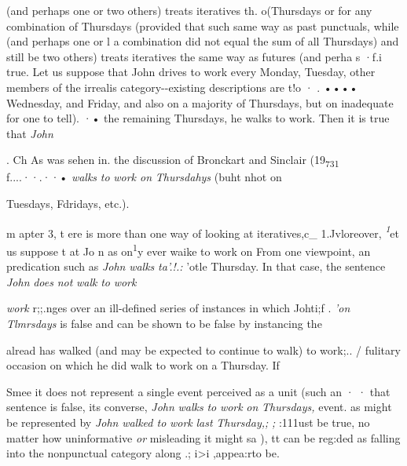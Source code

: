 
 (and perhaps one or two others) treats iteratives th{\textquotedbl}{\textquotedbl}. o(Thursdays or for any combination of Thursdays (provided that such same way as past punctuals, while  (and perhaps one or l a combination did not equal the sum of all Thursdays) and still be
two others) treats iteratives the same way as futures (and perha s ·f.i
true. Let us suppose that John drives to work every Monday, Tuesday,
other members of the irrealis category-{}-existing descriptions are t!o · . •••• Wednesday, and Friday, and also on a majority of Thursdays, but on inadequate for one to tell). ·• the remaining Thursdays, he walks to work. Then it is true that \textit{John}

. Ch As was sehen in. the discussion of Bronckart and Sinclair (19\textsubscript{7}\textsubscript{3}\textsubscript{1}\textsubscript{ }f....··.··• \textit{walks} \textit{to} \textit{w}\textit{ork on} \textit{Thursd}\textit{a}\textit{h}\textit{ys }(buht nhot on

Tuesdays, Fdridays, etc.).

m apter 3, t ere is more than one way of looking at iteratives,c\_ 1.Jvloreover, \textit{\textsuperscript{1}}et us suppose t at Jo n as on\textsuperscript{1}y ever waike to work on From one viewpoint, an  predication such as \textit{John} \textit{wal}\textit{k}\textit{s} \textit{t}\textit{a}\textit{'}\textit{.}\textit{!.: }'otle Thursday. In that case, the sentence \textit{John} \textit{does} \textit{not} \textit{walk} \textit{to} \textit{work}

\textit{work }r;;.nges over an ill-defined series of instances in which Johti;f . \textit{'}\textit{on} \textit{Tlmrsdays} is false and can be shown to be false by instancing the

alread has walked (and may be expected to continue to walk) to work;.. / fulitary occasion on which he did walk to work on a Thursday. If

Smee it does not represent a single event perceived as a unit (such an · · that sentence is false, its converse, \textit{John} \textit{walks} \textit{to} \textit{work} \textit{on} \textit{Thursdays,} event. as might be represented by \textit{John} \textit{walked to} \textit{work} \textit{last} \textit{Thursday,;} \textit{; }:111ust be true, no matter how uninformative \textit{or} misleading it might sa ), tt can be reg:{\textquotedbl}ded as falling into the nonpunctual category along .; i{\textgreater}i ,appea:rto be.

